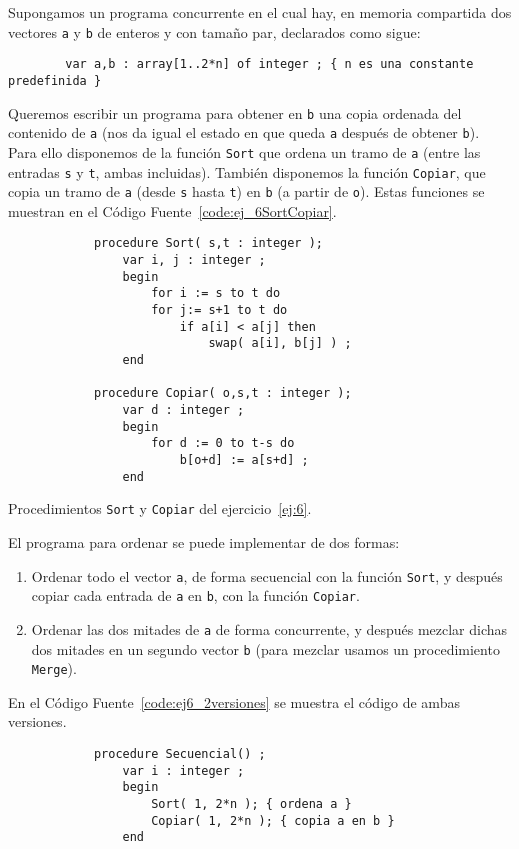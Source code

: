 \begin{ejercicio} \label{ej:6}
    Supongamos un programa concurrente en el cual hay, en memoria compartida dos vectores \verb|a| y
    \verb|b| de enteros y con tamaño par, declarados como sigue:
    \begin{verbatim}
        var a,b : array[1..2*n] of integer ; { n es una constante predefinida }
    \end{verbatim}
    Queremos escribir un programa para obtener en \verb|b| una copia ordenada del contenido de \verb|a| (nos
    da igual el estado en que queda \verb|a| después de obtener \verb|b|). Para ello disponemos de la función
    \verb|Sort| que ordena un tramo de \verb|a| (entre las entradas \verb|s| y \verb|t|, ambas incluidas). También disponemos
    la función \verb|Copiar|, que copia un tramo de \verb|a| (desde \verb|s| hasta \verb|t|) en \verb|b| (a partir de \verb|o|). Estas funciones
    se muestran en el Código Fuente~\ref{code:ej_6SortCopiar}.
    \begin{listing}
        \begin{verbatim}
            procedure Sort( s,t : integer );
                var i, j : integer ;
                begin
                    for i := s to t do
                    for j:= s+1 to t do
                        if a[i] < a[j] then
                            swap( a[i], b[j] ) ;
                end

            procedure Copiar( o,s,t : integer );
                var d : integer ;
                begin
                    for d := 0 to t-s do
                        b[o+d] := a[s+d] ;
                end
        \end{verbatim}
        \caption{Procedimientos \texttt{Sort} y \texttt{Copiar} del ejercicio~\ref{ej:6}.}
        \label{code:ej_6SortCopiar}
    \end{listing}

    El programa para ordenar se puede implementar de dos formas:
    \begin{enumerate}
        \item Ordenar todo el vector \verb|a|, de forma secuencial con la función \verb|Sort|, y después copiar cada
        entrada de \verb|a| en \verb|b|, con la función \verb|Copiar|.
        \item Ordenar las dos mitades de \verb|a| de forma concurrente, y después mezclar dichas dos mitades
        en un segundo vector \verb|b| (para mezclar usamos un procedimiento \verb|Merge|).
    \end{enumerate}
    En el Código Fuente~\ref{code:ej6_2versiones} se muestra el código de ambas versiones.
    \begin{listing}
        \begin{verbatim}
            procedure Secuencial() ;
                var i : integer ;
                begin
                    Sort( 1, 2*n ); { ordena a }
                    Copiar( 1, 2*n ); { copia a en b }
                end


\end{verbatim}
\end{listing}
\end{ejercicio}
